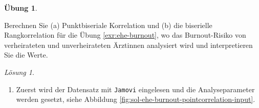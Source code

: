 \documentclass[
]{book}
\providecommand{\tightlist}{%
  \setlength{\itemsep}{0pt}\setlength{\parskip}{0pt}}
\theoremstyle{definition}
\theoremstyle{definition}
\theoremstyle{definition}
\newtheorem{exercise}{Übung}[chapter]
\theoremstyle{definition}
\theoremstyle{remark}
\newtheorem*{solution}{Lösung}
\begin{document}
\begin{exercise}
\protect\hypertarget{exr:ehe-burnout-correlation}{}\label{exr:ehe-burnout-correlation}\leavevmode

Berechnen Sie (a) Punktbiseriale Korrelation und (b) die biserielle Rangkorrelation für die Übung \ref{exr:ehe-burnout}, wo das Burnout-Risiko von verheirateten und unverheirateten Ärztinnen analysiert wird und interpretieren Sie die Werte.

\end{exercise}

\begin{solution}
\leavevmode

\begin{enumerate}
\def\labelenumi{\alph{enumi})}
\tightlist
\item
  Zuerst wird der Datensatz mit \texttt{Jamovi} eingelesen und die Analyseparameter werden gesetzt, siehe Abbildung \ref{fig:sol-ehe-burnout-pointcorrelation-input}.
\end{enumerate}


\end{solution}
\end{document}
